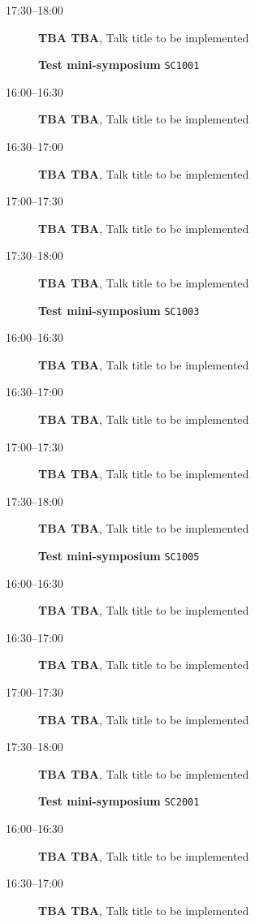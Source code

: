 \documentclass[ILAS2025-program.tex]{subfiles}
\begin{document}
\begin{description}
\begin{description}
        \item[17:30--18:00] \textbf{TBA TBA}, Talk title to be implemented
        \end{description}
    \begin{description}
    \item[] \textbf{Test mini-symposium} {\footnotesize\texttt{SC1001}}
    \item[16:00--16:30] \textbf{TBA TBA}, Talk title to be implemented
        \item[16:30--17:00] \textbf{TBA TBA}, Talk title to be implemented
        \item[17:00--17:30] \textbf{TBA TBA}, Talk title to be implemented
        \item[17:30--18:00] \textbf{TBA TBA}, Talk title to be implemented
        \end{description}
    \begin{description}
    \item[] \textbf{Test mini-symposium} {\footnotesize\texttt{SC1003}}
    \item[16:00--16:30] \textbf{TBA TBA}, Talk title to be implemented
        \item[16:30--17:00] \textbf{TBA TBA}, Talk title to be implemented
        \item[17:00--17:30] \textbf{TBA TBA}, Talk title to be implemented
        \item[17:30--18:00] \textbf{TBA TBA}, Talk title to be implemented
        \end{description}
    \begin{description}
    \item[] \textbf{Test mini-symposium} {\footnotesize\texttt{SC1005}}
    \item[16:00--16:30] \textbf{TBA TBA}, Talk title to be implemented
        \item[16:30--17:00] \textbf{TBA TBA}, Talk title to be implemented
        \item[17:00--17:30] \textbf{TBA TBA}, Talk title to be implemented
        \item[17:30--18:00] \textbf{TBA TBA}, Talk title to be implemented
        \end{description}
    \begin{description}
    \item[] \textbf{Test mini-symposium} {\footnotesize\texttt{SC2001}}
    \item[16:00--16:30] \textbf{TBA TBA}, Talk title to be implemented
        \item[16:30--17:00] \textbf{TBA TBA}, Talk title to be implemented

\end{description}
\end{description}
\end{document}
